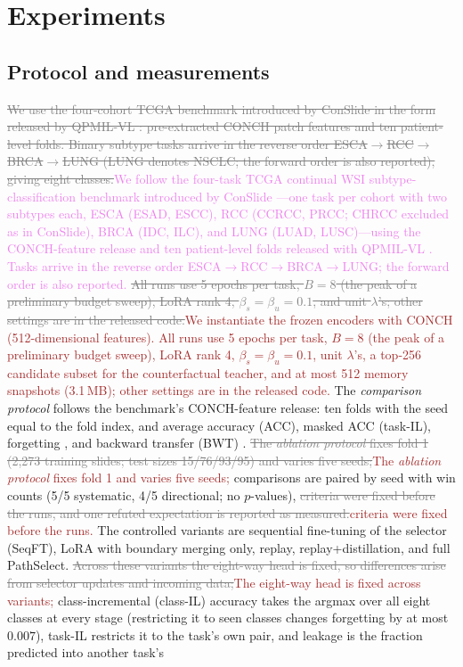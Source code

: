 \documentclass{article}
\newif\ifmarkup \markuptrue
\newcommand{\repc}[3]{\ifmarkup\textcolor{gray}{\sout{#2}}\textcolor{#1}{#3}\else#3\fi}
\newcommand{\repP}[2]{\repc{violet}{#1}{#2}}  %
\newcommand{\repB}[2]{\repc{brown}{#1}{#2}}   %
\begin{document}
\section{Experiments}
\label{sec:exp}

\subsection{Protocol and measurements}

\repP{We use the four-cohort TCGA benchmark introduced by ConSlide \cite{huang2023conslide} in the form released by QPMIL-VL \cite{gou2025qpmil}: pre-extracted CONCH patch features and ten patient-level folds. Binary subtype tasks arrive in the reverse order ESCA$\rightarrow$RCC$\rightarrow$BRCA$\rightarrow$LUNG (LUNG denotes NSCLC; the forward order is also reported), giving eight classes.}{We follow the four-task TCGA continual WSI subtype-classification benchmark introduced by ConSlide \cite{huang2023conslide}---one task per cohort with two subtypes each, ESCA (ESAD, ESCC), RCC (CCRCC, PRCC; CHRCC excluded as in ConSlide), BRCA (IDC, ILC), and LUNG (LUAD, LUSC)---using the CONCH-feature release and ten patient-level folds released with QPMIL-VL \cite{gou2025qpmil}. Tasks arrive in the reverse order ESCA$\rightarrow$RCC$\rightarrow$BRCA$\rightarrow$LUNG; the forward order is also reported.} \repB{All runs use 5 epochs per task, $B=8$ (the peak of a preliminary budget sweep), LoRA rank 4, $\beta_s{=}\beta_u{=}0.1$, and unit $\lambda$'s; other settings are in the released code.}{We instantiate the frozen encoders with CONCH \cite{lu2024conch} (512-dimensional features). All runs use 5 epochs per task, $B=8$ (the peak of a preliminary budget sweep), LoRA rank 4, $\beta_s{=}\beta_u{=}0.1$, unit $\lambda$'s, a top-256 candidate subset for the counterfactual teacher, and at most 512 memory snapshots (3.1\,MB); other settings are in the released code.} The \emph{comparison protocol} follows the benchmark's CONCH-feature release: ten folds with the seed equal to the fold index, and average accuracy (ACC), masked ACC (task-IL), forgetting \cite{chaudhry2018rwalk}, and backward transfer (BWT) \cite{lopezpaz2017gem}. \repB{The \emph{ablation protocol} fixes fold 1 (2,273 training slides; test sizes 15/76/93/95) and varies five seeds;}{The \emph{ablation protocol} fixes fold 1 and varies five seeds;} comparisons are paired by seed with win counts (5/5 systematic, 4/5 directional; no $p$-values), \repB{criteria were fixed before the runs, and one refuted expectation is reported as measured.}{criteria were fixed before the runs.} The controlled variants are sequential fine-tuning of the selector (SeqFT), LoRA with boundary merging only, replay, replay+distillation, and full PathSelect. \repB{Across these variants the eight-way head is fixed, so differences arise from selector updates and incoming data;}{The eight-way head is fixed across variants;} class-incremental (class-IL) accuracy takes the argmax over all eight classes at every stage (restricting it to seen classes changes forgetting by at most $0.007$), task-IL restricts it to the task's own pair, and leakage is the fraction predicted into another task's 
\end{document}
